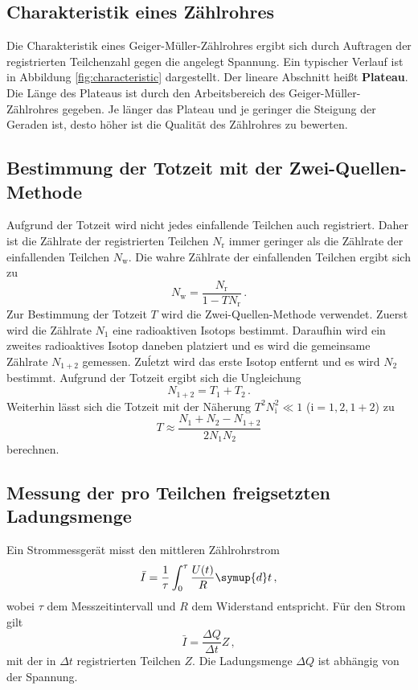 \subsection{Charakteristik eines Zählrohres}
Die Charakteristik eines Geiger-Müller-Zählrohres ergibt sich durch Auftragen der 
registrierten Teilchenzahl gegen die angelegt Spannung. Ein typischer Verlauf ist in Abbildung
\ref{fig:characteristic} dargestellt. Der lineare Abschnitt heißt \textbf{Plateau}.
Die Länge des Plateaus ist durch den Arbeitsbereich des Geiger-Müller-Zählrohres gegeben.
Je länger das Plateau und je geringer die Steigung der Geraden ist, desto höher ist die 
Qualität des Zählrohres zu bewerten.
\subsection{Bestimmung der Totzeit mit der Zwei-Quellen-Methode}
Aufgrund der Totzeit wird nicht jedes einfallende Teilchen auch registriert. Daher ist die 
Zählrate der registrierten Teilchen $N_{\mathrm{r}}$ immer geringer als die Zählrate der 
einfallenden
Teilchen $N_{\mathrm{w}}$. Die wahre Zählrate der einfallenden Teilchen ergibt sich zu
\begin{equation}
	N_{\mathrm{w}} = \frac{N_{\mathrm{r}}}{1-TN_{\mathrm{r}}} \, \mathrm{.}
\end{equation}
Zur Bestimmung der Totzeit $T$ wird die Zwei-Quellen-Methode verwendet.
Zuerst wird die Zählrate $N_1$ eine radioaktiven Isotops bestimmt.
Daraufhin wird ein zweites radioaktives Isotop daneben platziert und es wird die gemeinsame
Zählrate $N_{1+2}$ gemessen. Zuĺetzt wird das erste Isotop entfernt und es wird $N_2$ bestimmt.
Aufgrund der Totzeit ergibt sich die Ungleichung 
\begin{equation*}
	N_{1+2} = T_1 + T_2 \, \mathrm{.}
\end{equation*}
Weiterhin lässt sich die Totzeit mit der Näherung $T^2 N_{\mathrm{i}}^2 \ll 1$ ($\mathrm{i} = 
1, 2 , 1+2$) zu
\begin{equation}
	T \approx \frac{N_1 + N_2 - N_{1+2}}{2N_1N_2}
\end{equation}
berechnen.
\subsection{Messung der pro Teilchen freigsetzten Ladungsmenge}
Ein Strommessgerät misst den mittleren Zählrohrstrom
\begin{equation}
	\bar{I} = \frac{1}{\tau} \int_0^{\tau} \frac{U(t)}{R} \symup{d}t \, \mathrm{,}
\end{equation}
wobei $\tau$ dem Messzeitintervall und $R$ dem Widerstand entspricht.
Für den Strom gilt
\begin{equation}
	\bar{I} = \frac{\Delta Q}{\Delta t} Z \, \mathrm{,}
\end{equation}
mit der in $\Delta t$ registrierten Teilchen $Z$.
Die Ladungsmenge $\Delta Q$ ist abhängig von der Spannung.
